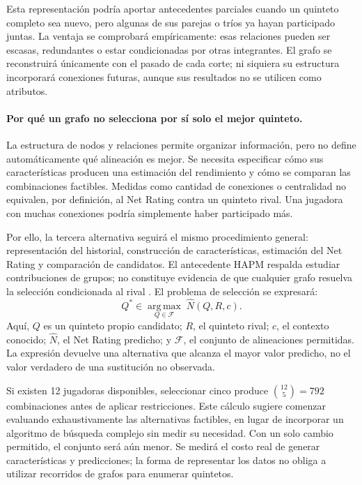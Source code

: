 Esta representación podría aportar antecedentes parciales cuando un quinteto completo sea nuevo, pero algunas de sus parejas o tríos ya hayan participado juntas. La ventaja se comprobará empíricamente: esas relaciones pueden ser escasas, redundantes o estar condicionadas por otras integrantes. El grafo se reconstruirá únicamente con el pasado de cada corte; ni siquiera su estructura incorporará conexiones futuras, aunque sus resultados no se utilicen como atributos.

\paragraph*{Por qué un grafo no selecciona por sí solo el mejor quinteto.}
La estructura de nodos y relaciones permite organizar información, pero no define automáticamente qué alineación es mejor. Se necesita especificar cómo sus características producen una estimación del rendimiento y cómo se comparan las combinaciones factibles. Medidas como cantidad de conexiones o centralidad no equivalen, por definición, al Net Rating contra un quinteto rival. Una jugadora con muchas conexiones podría simplemente haber participado más.

Por ello, la tercera alternativa seguirá el mismo procedimiento general: representación del historial, construcción de características, estimación del Net Rating y comparación de candidatos. El antecedente HAPM respalda estudiar contribuciones de grupos; no constituye evidencia de que cualquier grafo resuelva la selección condicionada al rival \cite{josephs2025hypergraphadjustedplusminus}. El problema de selección se expresará:
\[
 Q^* \in \underset{Q\in\mathcal{F}}{\operatorname{arg\,max}}\;
 \widehat N(Q,R,c).
\]
Aquí, $Q$ es un quinteto propio candidato; $R$, el quinteto rival; $c$, el contexto conocido; $\widehat N$, el Net Rating predicho; y $\mathcal{F}$, el conjunto de alineaciones permitidas. La expresión devuelve una alternativa que alcanza el mayor valor predicho, no el valor verdadero de una sustitución no observada.

Si existen 12 jugadoras disponibles, seleccionar cinco produce $\binom{12}{5}=792$ combinaciones antes de aplicar restricciones. Este cálculo sugiere comenzar evaluando exhaustivamente las alternativas factibles, en lugar de incorporar un algoritmo de búsqueda complejo sin medir su necesidad. Con un solo cambio permitido, el conjunto será aún menor. Se medirá el costo real de generar características y predicciones; la forma de representar los datos no obliga a utilizar recorridos de grafos para enumerar quintetos.

